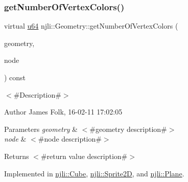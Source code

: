 \mbox{\label{classnjli_1_1_geometry_a224b18abc15b88b556e6b71bb89ecf73}} 
\subsubsection{\texorpdfstring{get\+Number\+Of\+Vertex\+Colors()}{getNumberOfVertexColors()}}
{\footnotesize\ttfamily virtual \mbox{\hyperlink{_util_8h_ad758b7a5c3f18ed79d2fcd23d9f16357}{u64}} njli\+::\+Geometry\+::get\+Number\+Of\+Vertex\+Colors (\begin{DoxyParamCaption}\item[{\mbox{\hyperlink{classnjli_1_1_level_of_detail}{Level\+Of\+Detail}} $\ast$}]{geometry,  }\item[{\mbox{\hyperlink{classnjli_1_1_node}{Node}} $\ast$}]{node }\end{DoxyParamCaption}) const\hspace{0.3cm}{\ttfamily [pure virtual]}}



$<$\#\+Description\#$>$ 

\begin{DoxyAuthor}{Author}
James Folk, 16-\/02-\/11 17\+:02\+:05
\end{DoxyAuthor}

\begin{DoxyParams}{Parameters}
{\em geometry} & $<$\#geometry description\#$>$ \\
\hline
{\em node} & $<$\#node description\#$>$\\
\hline
\end{DoxyParams}
\begin{DoxyReturn}{Returns}
$<$\#return value description\#$>$ 
\end{DoxyReturn}


Implemented in \mbox{\hyperlink{classnjli_1_1_cube_ad0a716c391963e9e64e26900b8e152a4}{njli\+::\+Cube}}, \mbox{\hyperlink{classnjli_1_1_sprite2_d_a2ecb47d5889333f482406230fe470e34}{njli\+::\+Sprite2D}}, and \mbox{\hyperlink{classnjli_1_1_plane_ad003f2734ae681dc704bac77d7e7ca89}{njli\+::\+Plane}}.

\mbox{\label{classnjli_1_1_geometry_a125699411e1abc464f923fe4e72fc65b}} 
